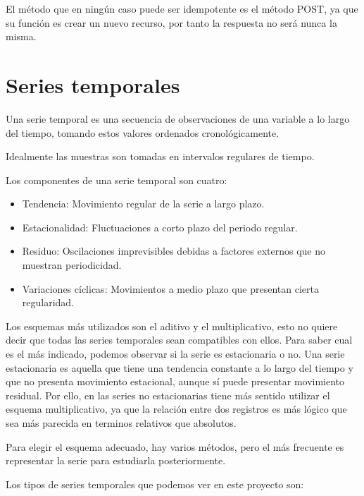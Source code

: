 El método que en ningún caso puede ser idempotente es el método POST, ya que su función es crear un nuevo recurso, por tanto la respuesta no será nunca la misma.

\section{Series temporales}
Una serie temporal \cite{time_series} es una secuencia de observaciones de una variable a lo largo del tiempo, tomando estos valores ordenados cronológicamente.

Idealmente las muestras son tomadas en intervalos regulares de tiempo.

Los componentes de una serie temporal son cuatro:
\begin{itemize}
\tightlist
    \item Tendencia: Movimiento regular de la serie a largo plazo.
    \item Estacionalidad: Fluctuaciones a corto plazo del periodo regular.
    \item Residuo: Oscilaciones imprevisibles debidas a factores externos que no muestran periodicidad.
    \item Variaciones cíclicas: Movimientos a medio plazo que presentan cierta regularidad.
\end{itemize}

Los esquemas más utilizados son el aditivo y el multiplicativo, esto no quiere decir que todas las series temporales sean compatibles con ellos. 
Para saber cual es el más indicado, podemos observar si la serie es estacionaria o no. Una serie estacionaria es aquella que tiene una tendencia constante a lo largo del tiempo y que no presenta movimiento estacional, aunque sí puede presentar movimiento residual.
Por ello, en las series no estacionarias tiene más sentido utilizar el esquema multiplicativo, ya que la relación entre dos registros es más lógico que sea más parecida en terminos relativos que absolutos.

Para elegir el esquema adecuado, hay varios métodos, pero el más frecuente es representar la serie para estudiarla posteriormente.

Los tipos de series temporales que podemos ver en este proyecto son: \cite{time_series_types}

